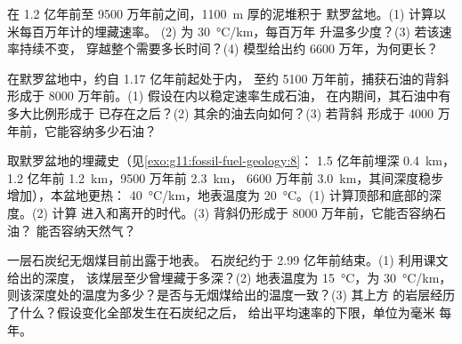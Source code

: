 \begin{exercise}[$\star\star\star$]\label{exo:g11:fossil-fuel-geology:12}
在 1.2 亿年前至 9500 万年前之间，\qty{1100}{m} 厚的泥堆积于
默罗盆地。(1) 计算以米每百万年计的埋藏速率。
(2) 为 \qty{30}{\degreeCelsius/km}，每百万年
升温多少度？(3) 若该速率持续不变，
穿越整个需要多长时间？(4) 模型给出约
6600 万年，为何更长？
\end{exercise}

\begin{exercise}[$\star\star\star$]\label{exo:g11:fossil-fuel-geology:13}
在默罗盆地中，约自 1.17 亿年前起处于内，
至约 5100 万年前，捕获石油的背斜形成于
8000 万年前。(1) 假设在内以稳定速率生成石油，
在内期间，其石油中有多大比例形成于
已存在之后？(2) 其余的油去向如何？(3) 若背斜
形成于 4000 万年前，它能容纳多少石油？
\end{exercise}

\begin{exercise}[$\star\star\star$]\label{exo:g11:fossil-fuel-geology:14}
取默罗盆地的埋藏史（见\cref{exo:g11:fossil-fuel-geology:8}：
1.5 亿年前埋深 \qty{0.4}{km}，1.2 亿年前 \qty{1.2}{km}，9500 万年前 \qty{2.3}{km}，
6600 万年前 \qty{3.0}{km}，其间深度稳步增加），本盆地更热：
 \qty{40}{\degreeCelsius/km}，地表温度为
\qty{20}{\degreeCelsius}。(1) 计算顶部和底部的深度。(2) 计算
进入和离开的时代。(3) 背斜仍形成于
8000 万年前，它能否容纳石油？
能否容纳天然气？
\end{exercise}

\begin{exercise}[$\star\star\star$]\label{exo:g11:fossil-fuel-geology:15}
一层石炭纪无烟煤目前出露于地表。
石炭纪约于 2.99 亿年前结束。(1) 利用课文给出的深度，
该煤层至少曾埋藏于多深？(2) 地表温度为
\qty{15}{\degreeCelsius}，为 \qty{30}{\degreeCelsius/km}，
则该深度处的温度为多少？是否与无烟煤给出的温度一致？(3) 其上方
的岩层经历了什么？假设变化全部发生在石炭纪之后，
给出平均速率的下限，单位为毫米
每年。
\end{exercise}

